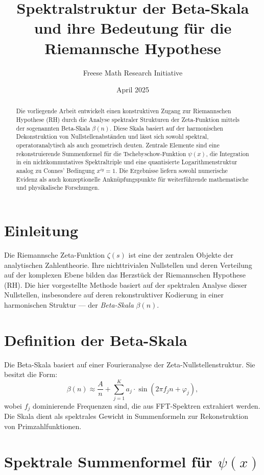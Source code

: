 \documentclass[11pt]{article}
\title{\textbf{Spektralstruktur der Beta-Skala und ihre Bedeutung für die Riemannsche Hypothese}}
\author{Freese Math Research Initiative}
\date{April 2025}
\begin{document}
\maketitle

\begin{abstract}
Die vorliegende Arbeit entwickelt einen konstruktiven Zugang zur Riemannschen Hypothese (RH) durch die Analyse spektraler Strukturen der Zeta-Funktion mittels der sogenannten Beta-Skala $\beta(n)$. Diese Skala basiert auf der harmonischen Dekonstruktion von Nullstellenabständen und lässt sich sowohl spektral, operatoranalytisch als auch geometrisch deuten. Zentrale Elemente sind eine rekonstruierende Summenformel für die Tschebyschow-Funktion $\psi(x)$, die Integration in ein nichtkommutatives Spektraltriple und eine quantisierte Logarithmenstruktur analog zu Connes’ Bedingung $x^{iy} = 1$. Die Ergebnisse liefern sowohl numerische Evidenz als auch konzeptionelle Anknüpfungspunkte für weiterführende mathematische und physikalische Forschungen.
\end{abstract}

\section{Einleitung}

Die Riemannsche Zeta-Funktion $\zeta(s)$ ist eine der zentralen Objekte der analytischen Zahlentheorie. Ihre nichttrivialen Nullstellen und deren Verteilung auf der komplexen Ebene bilden das Herzstück der Riemannschen Hypothese (RH). Die hier vorgestellte Methode basiert auf der spektralen Analyse dieser Nullstellen, insbesondere auf deren rekonstruktiver Kodierung in einer harmonischen Struktur — der \emph{Beta-Skala} $\beta(n)$.

\section{Definition der Beta-Skala}

Die Beta-Skala basiert auf einer Fourieranalyse der Zeta-Nullstellenstruktur. Sie besitzt die Form:
\begin{equation}
\beta(n) \approx \frac{A}{n} + \sum_{j=1}^K a_j \cdot \sin(2\pi f_j n + \varphi_j),
\end{equation}
wobei $f_j$ dominierende Frequenzen sind, die aus FFT-Spektren extrahiert werden. Die Skala dient als spektrales Gewicht in Summenformeln zur Rekonstruktion von Primzahlfunktionen.

\section{Spektrale Summenformel für \texorpdfstring{$\psi(x)$}{psi(x)}}
\end{document}
